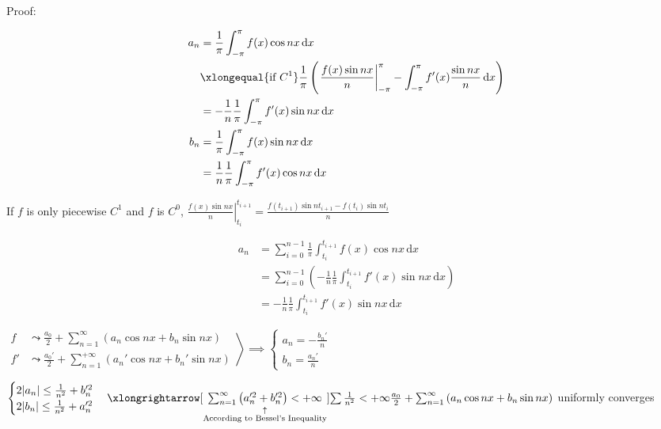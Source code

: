 Proof:

\begin{align*}
    a_n
     & =\frac{1}{\pi}\int_{-\pi}^{\pi}f(x)\cos nx\,\mathrm{d}x                                                                                                  \\
     & \xlongequal{\text{if }C^1}\frac{1}{\pi}\left(\left.\frac{f(x)\sin nx}{n}\right|_{-\pi}^{\pi}-\int_{-\pi}^{\pi}f'(x)\frac{\sin nx}{n}\,\mathrm{d}x\right) \\
     & =-\frac{1}{n}\frac{1}{\pi}\int_{-\pi}^{\pi}f'(x)\sin nx\,\mathrm{d}x                                                                                     \\
    b_n
     & =\frac{1}{\pi}\int_{-\pi}^{\pi}f(x)\sin nx\,\mathrm{d}x                                                                                                  \\
     & =\frac{1}{n}\frac{1}{\pi}\int_{-\pi}^{\pi}f'(x)\cos nx\,\mathrm{d}x
\end{align*}

If $f$ is only piecewise $C^1$ and $f$ is $C^0$, $\left.\frac{f(x)\sin nx}{n}\right|_{t_i}^{t_{i+1}}=\frac{f(t_{i+1})\sin nt_{i+1}-f(t_i)\sin n t_i}{n}$

\begin{align*}
    a_n & =\sum_{i=0}^{n-1}\frac{1}{\pi}\int_{t_i}^{t_{i+1}}f(x)\cos nx\,\mathrm{d}x                           \\
        & =\sum_{i=0}^{n-1}\left(-\frac{1}{n}\frac{1}{\pi}\int_{t_i}^{t_{i+1}}f'(x)\sin nx\,\mathrm{d}x\right) \\
        & =-\frac{1}{n}\frac{1}{\pi}\int_{t_i}^{t_{i+1}}f'(x)\sin nx\,\mathrm{d}x
\end{align*}

$\left.\begin{aligned}
        f  & \leadsto\frac{a_0}{2}+\sum_{n=1}^{\infty}\left(a_n\cos nx+b_n\sin nx\right)     \\
        f' & \leadsto\frac{a_0'}{2}+\sum_{n=1}^{+\infty}\left(a_n'\cos nx+b_n'\sin nx\right)
    \end{aligned}\right>\implies\begin{cases}
        a_n=-\frac{b_n'}{n} \\
        b_n=\frac{a_n'}{n}
    \end{cases}$

$\begin{cases}
        2|a_n|\leq\frac{1}{n^2}+b_n'^2 \\
        2|b_n|\leq\frac{1}{n^2}+a_n'^2
    \end{cases}\xlongrightarrow[\underset{\substack{\uparrow\\\text{According to Bessel's Inequality}}}{\sum_{n=1}^{\infty}\left(a_n'^2+b_n'^2\right)<+\infty}]{\sum\frac{1}{n^2}<+\infty}\frac{a_0}{2}+\sum_{n=1}^{\infty}\left(a_n\cos nx+b_n\sin nx\right)$ uniformly converges

